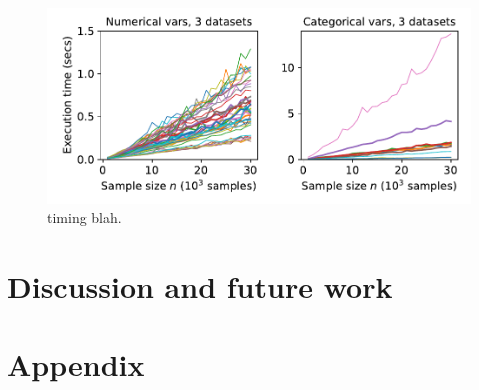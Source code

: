 \documentclass{article}
\newcommand{\cut}[1]{}
\newcommand{\xnj}{${\bf X}_{\texttt{\char`\\}j}$}
\begin{document}
\begin{figure}[htbp]
\begin{center}
\includegraphics[scale=.4]{images/timing.pdf}
\caption{\small timing blah.}
\label{fig:timing}
\end{center}
\end{figure}


\section{Discussion and future work}

\section{Appendix}

\cut{
\begin{alltt}
{\fontfamily{cmss}\selectfont\small
{\bf{}StratPD}
\(T\) = Tree regressor fit to \xnj with hyper parameter {\tt{}min_samples_leaf}
For each leaf in \(T\):
    \(\bf\overline{y}\) = Group leaf samples by \(x\sb{j}\), computing average \(y\) per unique \(x\sb{j}\)
    {\bf{}dx} = discrete difference between adjacent unique \(x\sb{j}\) values
    {\bf{}dy} = discrete difference between adjacent average \(\bf\overline{y}\) values
    add (x[i], x[i+1], dy[i]/dx[i]) for each unique \(x\sb{j}\) to list D
For each \(x\) in unique \({\bf{}X}\sb{j}\):
    slopes = [\(slope\) for (\(a, b, slope\)) in D if \(x \ge a\) and \(x < b\)]
    count[x] = |slopes|
    dydx[x] = mean(slopes)
Drop slope estimates computed using fewer than {\tt{}min_slopes_per_x values}
pdx = discrete difference between adjacent unique \(x\sb{j}\)
pdy = cumulative sum of dydx * pdx
return pdx, [0]+pdy  // insert 0 for pdx[0] since sum contributed from beyond left is 0
}
\end{alltt}
}
\end{document}
